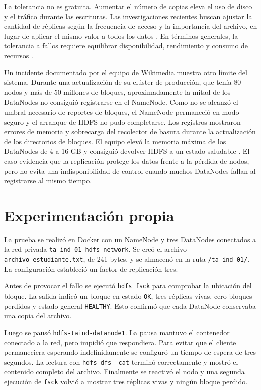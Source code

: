 \documentclass[12pt,a4paper]{article}
\begin{document}
La tolerancia no es gratuita. Aumentar el número de copias eleva el uso de disco y el tráfico durante las escrituras. Las investigaciones recientes buscan ajustar la cantidad de réplicas según la frecuencia de acceso y la importancia del archivo, en lugar de aplicar el mismo valor a todos los datos \cite{tlich2025replication}. En términos generales, la tolerancia a fallos requiere equilibrar disponibilidad, rendimiento y consumo de recursos \cite{saadoon2022fault}.

Un incidente documentado por el equipo de Wikimedia muestra otro límite del sistema. Durante una actualización de su clúster de producción, que tenía 80 nodos y más de 50 millones de bloques, aproximadamente la mitad de los DataNodes no consiguió registrarse en el NameNode. Como no se alcanzó el umbral necesario de reportes de bloques, el NameNode permaneció en modo seguro y el arranque de HDFS no pudo completarse. Los registros mostraron errores de memoria y sobrecarga del recolector de basura durante la actualización de los directorios de bloques. El equipo elevó la memoria máxima de los DataNodes de 4 a 16 GB y consiguió devolver HDFS a un estado saludable \cite{wikimedia2021upgrade}. El caso evidencia que la replicación protege los datos frente a la pérdida de nodos, pero no evita una indisponibilidad de control cuando muchos DataNodes fallan al registrarse al mismo tiempo.

\section{Experimentación propia}

La prueba se realizó en Docker con un NameNode y tres DataNodes conectados a la red privada \texttt{ta-ind-01-hdfs-network}. Se creó el archivo \texttt{archivo\_estudiante.txt}, de 241 bytes, y se almacenó en la ruta \texttt{/ta-ind-01/}. La configuración estableció un factor de replicación tres.

Antes de provocar el fallo se ejecutó \texttt{hdfs fsck} para comprobar la ubicación del bloque. La salida indicó un bloque en estado \texttt{OK}, tres réplicas vivas, cero bloques perdidos y estado general \texttt{HEALTHY}. Esto confirmó que cada DataNode conservaba una copia del archivo.

Luego se pausó \texttt{hdfs-taind-datanode1}. La pausa mantuvo el contenedor conectado a la red, pero impidió que respondiera. Para evitar que el cliente permaneciera esperando indefinidamente se configuró un tiempo de espera de tres segundos. La lectura con \texttt{hdfs dfs -cat} terminó correctamente y mostró el contenido completo del archivo. Finalmente se reactivó el nodo y una segunda ejecución de \texttt{fsck} volvió a mostrar tres réplicas vivas y ningún bloque perdido.
\end{document}
